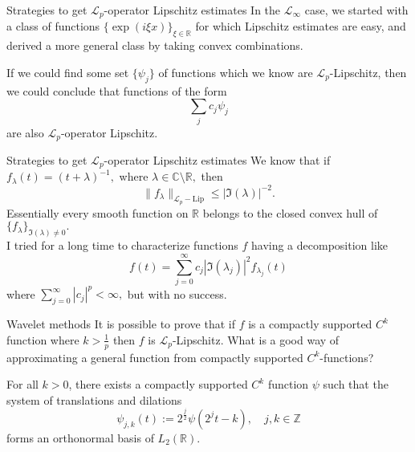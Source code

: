 \documentclass{beamer}
\numberwithin{equation}{section}
\theoremstyle{plain}
\theoremstyle{plain}
\theoremstyle{definition}
\theoremstyle{plain}
\theoremstyle{plain}
\theoremstyle{definition}
\newcommand{\Rl}{\mathbb{R}}
\newcommand{\Cplx}{\mathbb{C}}
\newcommand{\Itgr}{\mathbb{Z}}
\newcommand{\Lc}{\mathcal{L}}
\begin{document}
\begin{frame}{Strategies to get $\Lc_p$-operator Lipschitz estimates}
    In the $\Lc_{\infty}$ case, we started with a class of functions $\{\exp(i\xi x)\}_{\xi\in \Rl}$ for which Lipschitz estimates are easy, and derived a more general class by taking convex combinations.

    If we could find some set $\{\psi_j\}$ of functions which we know are $\Lc_p$-Lipschitz, then we could conclude that functions of the form
    \[
        \sum_j c_j\psi_j
    \]
    are also $\Lc_p$-operator Lipschitz.

\end{frame}

\begin{frame}{Strategies to get $\Lc_p$-operator Lipschitz estimates}
    We know that if $f_\lambda(t) = (t+\lambda)^{-1},$ where $\lambda\in \Cplx\setminus \Rl,$ then
    \[
        \|f_{\lambda}\|_{\Lc_p-\mathrm{Lip}} \leq |\Im(\lambda)|^{-2}.
    \]
    Essentially every smooth function on $\Rl$ belongs to the closed convex hull of $\{f_\lambda\}_{\Im(\lambda)\neq 0}.$\\
    \pause
    I tried for a long time to characterize functions $f$ having a decomposition like
    \[
        f(t) = \sum_{j=0}^\infty c_j|\Im(\lambda_j)|^2f_{\lambda_j}(t)
    \]
    where $\sum_{j=0}^\infty |c_j|^p < \infty,$ but with no success.
\end{frame}

\begin{frame}{Wavelet methods}
    It is possible to prove that if $f$ is a compactly supported $C^k$ function where $k > \frac{1}{p}$ then $f$ is $\Lc_p$-Lipschitz.
    \pause
    What is a good way of approximating a general function from compactly supported $C^k$-functions?\pause
    \begin{theorem}[Daubechies (1988)]
        For all $k>0$, there exists a compactly supported $C^k$ function $\psi$ such that the system of translations
        and dilations
        \begin{equation*}
            \psi_{j,k}(t) := 2^{\frac{j}{2}}\psi(2^jt-k),\quad j,k\in \Itgr
        \end{equation*}
        forms an orthonormal basis of $L_2(\Rl).$
    \end{theorem}
\end{frame}
\end{document}

